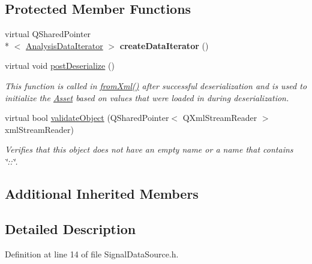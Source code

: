 \subsection*{Protected Member Functions}
\begin{DoxyCompactItemize}
\item 
\hypertarget{class_picto_1_1_signal_data_source_a6e5015013878115515097ed740fc2ace}{virtual Q\-Shared\-Pointer\\*
$<$ \hyperlink{class_picto_1_1_analysis_data_iterator}{Analysis\-Data\-Iterator} $>$ {\bfseries create\-Data\-Iterator} ()}\label{class_picto_1_1_signal_data_source_a6e5015013878115515097ed740fc2ace}

\item 
virtual void \hyperlink{class_picto_1_1_signal_data_source_a1ed324bf825b1967283042624c70d820}{post\-Deserialize} ()
\begin{DoxyCompactList}\small\item\em This function is called in \hyperlink{class_picto_1_1_asset_a8bed4da09ecb1c07ce0dab313a9aba67}{from\-Xml()} after successful deserialization and is used to initialize the \hyperlink{class_picto_1_1_asset}{Asset} based on values that were loaded in during deserialization. \end{DoxyCompactList}\item 
\hypertarget{class_picto_1_1_signal_data_source_a5ef013d7fa0078cdc66306a45746a2cf}{virtual bool \hyperlink{class_picto_1_1_signal_data_source_a5ef013d7fa0078cdc66306a45746a2cf}{validate\-Object} (Q\-Shared\-Pointer$<$ Q\-Xml\-Stream\-Reader $>$ xml\-Stream\-Reader)}\label{class_picto_1_1_signal_data_source_a5ef013d7fa0078cdc66306a45746a2cf}

\begin{DoxyCompactList}\small\item\em Verifies that this object does not have an empty name or a name that contains \char`\"{}\-::\char`\"{}. \end{DoxyCompactList}\end{DoxyCompactItemize}
\subsection*{Additional Inherited Members}


\subsection{Detailed Description}


Definition at line 14 of file Signal\-Data\-Source.\-h.



